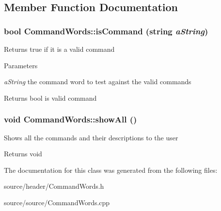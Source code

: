 \subsection{Member Function Documentation}
\hypertarget{classCommandWords_a462e98022a37c1699c14d45ab59c3f3f}{
\subsubsection[{isCommand}]{\setlength{\rightskip}{0pt plus 5cm}bool CommandWords::isCommand (string {\em aString})}}
\label{d0/dda/classCommandWords_a462e98022a37c1699c14d45ab59c3f3f}
Returns true if it is a valid command


\begin{DoxyParams}{Parameters}
\item[{\em aString}]the command word to test against the valid commands\end{DoxyParams}
\begin{DoxyReturn}{Returns}
bool is valid command 
\end{DoxyReturn}
\hypertarget{classCommandWords_aa449001a267676b74f1aacd89a6f84a4}{
\subsubsection[{showAll}]{\setlength{\rightskip}{0pt plus 5cm}void CommandWords::showAll ()}}
\label{d0/dda/classCommandWords_aa449001a267676b74f1aacd89a6f84a4}
Shows all the commands and their descriptions to the user

\begin{DoxyReturn}{Returns}
void 
\end{DoxyReturn}


The documentation for this class was generated from the following files:\begin{DoxyCompactItemize}
\item 
source/header/CommandWords.h\item 
source/source/CommandWords.cpp\end{DoxyCompactItemize}
